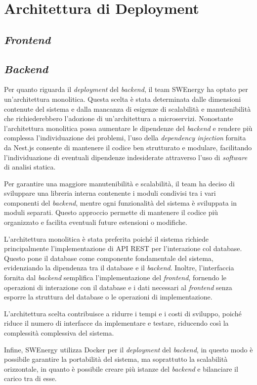 \section{Architettura di Deployment}

\subsection{\textit{Frontend}}

\subsection{\textit{Backend}}

Per quanto riguarda il \textit{deployment} del \textit{backend}, il team
SWEnergy ha optato per un'architettura monolitica. Questa scelta è stata
determinata dalle dimensioni contenute del sistema e dalla mancanza di esigenze
di scalabilità e manutenibilità che richiederebbero l'adozione di
un'architettura a microservizi. Nonostante l'architettura monolitica possa
aumentare le dipendenze del \textit{backend} e rendere più complessa
l'individuazione dei problemi, l'uso della \textit{dependency injection} fornita
da Nest.js consente di mantenere il codice ben strutturato e modulare,
facilitando l'individuazione di eventuali dipendenze indesiderate attraverso
l'uso di \textit{software} di analisi statica.

Per garantire una maggiore manutenibilità e scalabilità, il team ha deciso di
sviluppare una libreria interna contenente i moduli condivisi tra i vari
componenti del \textit{backend}, mentre ogni funzionalità del sistema è
sviluppata in moduli separati. Questo approccio permette di mantenere il codice
più organizzato e facilita eventuali future estensioni o modifiche.

L'architettura monolitica è stata preferita poiché il sistema richiede
principalmente l'implementazione di API REST per l'interazione col database.
Questo pone il database come componente fondamentale del sistema, evidenziando
la dipendenza tra il database e il \textit{backend}. Inoltre, l'interfaccia
fornita dal \textit{backend} semplifica l'implementazione del \textit{frontend},
fornendo le operazioni di interazione con il database e i dati necessari al
\textit{frontend} senza esporre la struttura del database o le operazioni di
implementazione.

L'architettura scelta contribuisce a ridurre i tempi e i costi di
sviluppo, poiché riduce il numero di interfacce da implementare e testare,
riducendo così la complessità complessiva del sistema.

Infine, SWEnergy utilizza Docker per il \textit{deployment} del
\textit{backend}, in questo modo è possibile garantire la portabilità del
sistema, ma soprattutto la scalabilità orizzontale, in quanto è possibile creare
più istanze del \textit{backend} e bilanciare il carico tra di esse.
